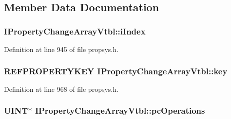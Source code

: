\subsection{Member Data Documentation}
\subsubsection[{\texorpdfstring{i\+Index}{iIndex}}]{ I\+Property\+Change\+Array\+Vtbl\+::i\+Index}\hypertarget{struct_i_property_change_array_vtbl_acfa70036730f768fc344b69b3cd64ad0}{}\label{struct_i_property_change_array_vtbl_acfa70036730f768fc344b69b3cd64ad0}


Definition at line 945 of file propsys.\+h.

\subsubsection[{\texorpdfstring{key}{key}}]{ {\bf R\+E\+F\+P\+R\+O\+P\+E\+R\+T\+Y\+K\+EY} I\+Property\+Change\+Array\+Vtbl\+::key}\hypertarget{struct_i_property_change_array_vtbl_a5a668e0a745dbfb3e7a0bb5525fea800}{}\label{struct_i_property_change_array_vtbl_a5a668e0a745dbfb3e7a0bb5525fea800}


Definition at line 968 of file propsys.\+h.

\subsubsection[{\texorpdfstring{pc\+Operations}{pcOperations}}]{ {\bf U\+I\+NT}$\ast$ I\+Property\+Change\+Array\+Vtbl\+::pc\+Operations}\hypertarget{struct_i_property_change_array_vtbl_abbe22467b2210a2b8b747c8cc7dc6fed}{}\label{struct_i_property_change_array_vtbl_abbe22467b2210a2b8b747c8cc7dc6fed}


